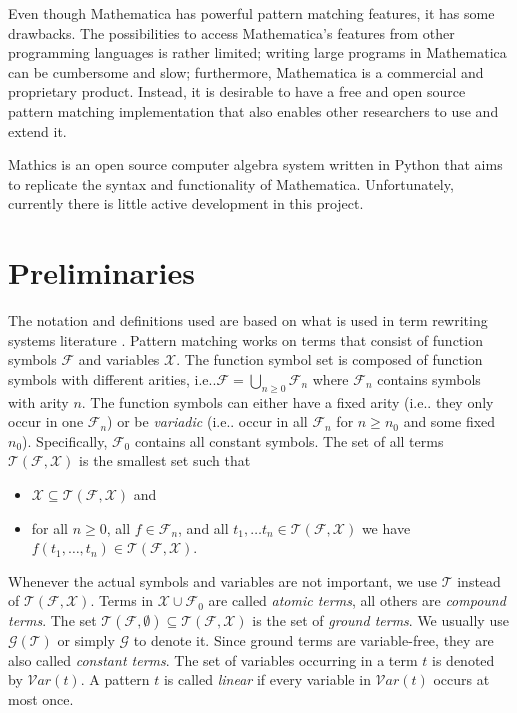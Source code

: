 \documentclass[conference,compsoc]{IEEEtran}
\makeatletter
\DeclareRobustCommand\onedot{\futurelet\@let@token\@onedot}
\def\@onedot{\ifx\@let@token.\else.\null\fi\xspace}
\def\ie{{i.e}\onedot} \def\Ie{{I.e}\onedot}
\newcommand{\termset}{\mathcal{T}}
\newcommand{\funcset}{\mathcal{F}}
\newcommand{\varset}{\mathcal{X}}
\newcommand{\groundset}{\mathcal{G}}
\newcommand{\vars}{\mathcal{V}ar}
\makeatother
\begin{document}
Even though Mathematica has powerful pattern matching features, it has some drawbacks. The
possibilities to access Mathematica's features from other programming languages is rather limited;
writing large programs in Mathematica can be cumbersome and slow; furthermore,
Mathematica is a commercial and proprietary product. Instead, it is desirable to have a free and
open source pattern matching implementation that also enables other researchers to use and extend it.

Mathics \cite{Mathics} is an open source computer algebra system written in Python that aims to replicate the syntax and functionality of Mathematica.
Unfortunately,  currently there is little active development in this project.

\section{Preliminaries}

The notation and definitions used are based on what is used in term rewriting systems literature \cite{Dershowitz1990,Baader1998,Klop2001}.
Pattern matching works on terms that consist of function symbols $\funcset$ and variables $\varset$.
The function symbol set is composed of function symbols with different arities, \ie $\funcset = \bigcup_{n\geq0} \funcset_n$ where $\funcset_n$ contains symbols with arity $n$.
The function symbols can either have a fixed arity (\ie they only occur in one
$\funcset_n$) or be \emph{variadic} (\ie occur in all $\funcset_n$ for $n \geq n_0$ and some fixed $n_0$).
Specifically, $\funcset_0$ contains all constant symbols.
The set of all terms $\termset(\funcset, \varset)$ is the smallest set such that
\begin{itemize}
\item $\varset \subseteq \termset(\funcset, \varset)$ and
\item for all $n \geq 0$, all $f \in \funcset_n$, and all $t_1, \dots t_n \in \termset(\funcset, \varset)$ we have $f(t_1, \dots, t_n) \in \termset(\funcset, \varset)$.
\end{itemize}
Whenever the actual symbols and variables are not important, we use $\termset$ instead of $\termset(\funcset, \varset)$.
Terms in $\varset \cup \funcset_0$ are called \emph{atomic terms}, all others are \emph{compound terms}.
The set $\termset(\funcset, \emptyset) \subseteq \termset(\funcset, \varset)$ is the set of \emph{ground terms}. We usually use $\groundset(\termset)$ or simply $\groundset$ to denote it.
Since ground terms are variable-free, they are also called
\emph{constant terms}.
The set of variables occurring in a term $t$ is denoted by $\vars(t)$.
A pattern $t$ is called \emph{linear} if every variable in $\vars(t)$ occurs at most once.
\end{document}
